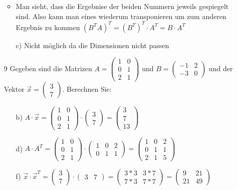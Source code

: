 \documentclass{article}
\begin{document}
\begin{itemize}
\begin{itemize}
			\item{Man sieht, dass die Ergebnise der beiden Nummern jeweils gespiegelt sind. Also kann man eines wiederum transponieren um zum anderen Ergebnis zu kommen $(B^TA)^T=(B^T)^T\cdot A^T=B\cdot A^T$}
			\item[c)]{Nicht möglich da die Dimensionen nicht passen}
		\end{itemize}
		\item[9]{Gegeben sind die Matrizen $A=\begin{pmatrix} 1 & 0 \\ 0 & 1 \\ 2 & 1 \end{pmatrix}$ und $B=\begin{pmatrix} -1 & 2 \\ -3 & 0 \end{pmatrix}$ und der Vektor $\vec{x}=\begin{pmatrix} 3 \\ 7 \end{pmatrix}$. Berechnen Sie:}
		\begin{itemize}
			\item[b)]{$A\cdot \vec{x}=\begin{pmatrix} 1 & 0 \\ 0 & 1 \\ 2 & 1 \end{pmatrix}\cdot \begin{pmatrix} 3 \\ 7 \end{pmatrix}=\begin{pmatrix} 3 \\ 7 \\ 13 \end{pmatrix}$}
			\item[d)]{$A\cdot A^T=\begin{pmatrix} 1 & 0 \\ 0 & 1 \\ 2 & 1 \end{pmatrix}\cdot \begin{pmatrix} 1 & 0 & 2 \\ 0 & 1 & 1 \end{pmatrix}=\begin{pmatrix} 1 & 0 & 2 \\ 0 & 1 & 1 \\ 2 & 1 & 5 \end{pmatrix}$}
			\item[f)]{$\vec{x}\cdot \vec{x}^T=\begin{pmatrix} 3 \\ 7 \end{pmatrix}\cdot \begin{pmatrix} 3 & 7 \end{pmatrix}=\begin{pmatrix} 3*3 & 3*7 \\ 7*3 & 7*7 \end{pmatrix}=\begin{pmatrix} 9 & 21 \\ 21 & 49 \end{pmatrix}$}

\end{itemize}
\end{itemize}
\end{document}
